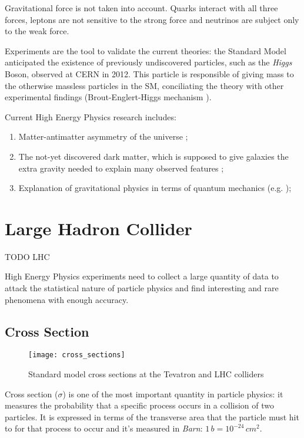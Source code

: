 Gravitational force is not taken into account. Quarks interact with all three forces, leptons are not sensitive to the strong force and neutrinos are subject only to the weak force.

Experiments are the tool to validate the current theories: the Standard Model anticipated the existence of previously undiscovered particles, such as the \textit{Higgs} Boson, observed at CERN in 2012. This particle is responsible of giving mass to the otherwise massless particles in the SM, conciliating the theory with other experimental findings (Brout-Englert-Higgs mechanism \cite{PhysRevLett.13.321, PhysRevLett.13.508}).

Current High Energy Physics research includes:
\begin{enumerate}
	\item Matter-antimatter asymmetry of the universe \cite{Bernreuther:2002uj};
	\item The not-yet discovered dark matter, which is supposed to give galaxies the extra gravity needed to explain many observed features \cite{bertone2005particle};
	\item Explanation of gravitational physics in terms of quantum mechanics (e.g. \cite{Rovelli:2011eq});
\end{enumerate}

\section{Large Hadron Collider}


TODO LHC

High Energy Physics experiments need to collect a large quantity of data to attack the statistical nature of particle physics and find interesting and rare phenomena with enough accuracy.

\subsection{Cross Section}

\begin{figure}

	\centerline{
		\texttt{[image: cross\_sections]}}
	\caption{Standard  model  cross  sections  at  the  Tevatron  and  LHC  colliders\cite{Bechtel:2009zza}}
	\label{fig:cross_sections}
\end{figure}

Cross section ($\sigma$) is one of the most important quantity in particle physics: it measures the probability that a specific process occurs in a collision of two particles. It is expressed in terms of the transverse area that the particle must hit to for that process to occur and it's measured in \textit{Barn}: $1\, b = 10^{-24} \,cm^2$.

